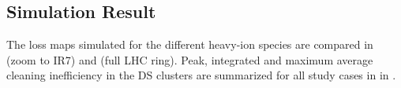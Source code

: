 

\subsection{Simulation Result}

The loss maps simulated for the different heavy-ion species are compared in  (zoom to IR7) and  (full LHC ring). Peak, integrated and maximum average cleaning inefficiency in the DS clusters are summarized for all study cases in in . 


